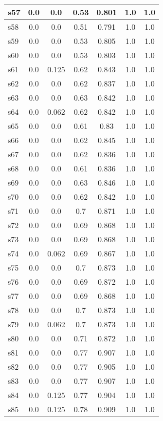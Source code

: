 \documentclass{article}
\begin{document}
\begin{tabular}{|l|c|c|c|c|c|c|}
\hline
s57 &0.0 & 0.0 & 0.53 & 0.801 & 1.0 & 1.0\\
\hline
s58 &0.0 & 0.0 & 0.51 & 0.791 & 1.0 & 1.0\\
\hline
s59 &0.0 & 0.0 & 0.53 & 0.805 & 1.0 & 1.0\\
\hline
s60 &0.0 & 0.0 & 0.53 & 0.803 & 1.0 & 1.0\\
\hline
s61 &0.0 & 0.125 & 0.62 & 0.843 & 1.0 & 1.0\\
\hline
s62 &0.0 & 0.0 & 0.62 & 0.837 & 1.0 & 1.0\\
\hline
s63 &0.0 & 0.0 & 0.63 & 0.842 & 1.0 & 1.0\\
\hline
s64 &0.0 & 0.062 & 0.62 & 0.842 & 1.0 & 1.0\\
\hline
s65 &0.0 & 0.0 & 0.61 & 0.83 & 1.0 & 1.0\\
\hline
s66 &0.0 & 0.0 & 0.62 & 0.845 & 1.0 & 1.0\\
\hline
s67 &0.0 & 0.0 & 0.62 & 0.836 & 1.0 & 1.0\\
\hline
s68 &0.0 & 0.0 & 0.61 & 0.836 & 1.0 & 1.0\\
\hline
s69 &0.0 & 0.0 & 0.63 & 0.846 & 1.0 & 1.0\\
\hline
s70 &0.0 & 0.0 & 0.62 & 0.842 & 1.0 & 1.0\\
\hline
s71 &0.0 & 0.0 & 0.7 & 0.871 & 1.0 & 1.0\\
\hline
s72 &0.0 & 0.0 & 0.69 & 0.868 & 1.0 & 1.0\\
\hline
s73 &0.0 & 0.0 & 0.69 & 0.868 & 1.0 & 1.0\\
\hline
s74 &0.0 & 0.062 & 0.69 & 0.867 & 1.0 & 1.0\\
\hline
s75 &0.0 & 0.0 & 0.7 & 0.873 & 1.0 & 1.0\\
\hline
s76 &0.0 & 0.0 & 0.69 & 0.872 & 1.0 & 1.0\\
\hline
s77 &0.0 & 0.0 & 0.69 & 0.868 & 1.0 & 1.0\\
\hline
s78 &0.0 & 0.0 & 0.7 & 0.873 & 1.0 & 1.0\\
\hline
s79 &0.0 & 0.062 & 0.7 & 0.873 & 1.0 & 1.0\\
\hline
s80 &0.0 & 0.0 & 0.71 & 0.872 & 1.0 & 1.0\\
\hline
s81 &0.0 & 0.0 & 0.77 & 0.907 & 1.0 & 1.0\\
\hline
s82 &0.0 & 0.0 & 0.77 & 0.905 & 1.0 & 1.0\\
\hline
s83 &0.0 & 0.0 & 0.77 & 0.907 & 1.0 & 1.0\\
\hline
s84 &0.0 & 0.125 & 0.77 & 0.904 & 1.0 & 1.0\\
\hline
s85 &0.0 & 0.125 & 0.78 & 0.909 & 1.0 & 1.0\\

\end{tabular}
\end{document}
